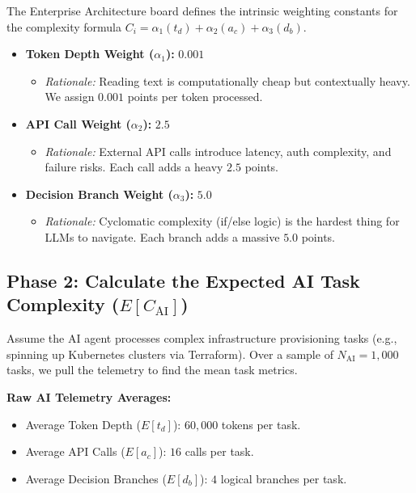 \documentclass[11pt,a4paper]{article}
\begin{document}
The Enterprise Architecture board defines the intrinsic weighting constants for the complexity formula $C_i = \alpha_1(t_d) + \alpha_2(a_c) + \alpha_3(d_b)$.

\begin{tcolorbox}[enhanced, colback=dpicloud!5!white, colframe=dpiblue, title={\textbf{Phase 1: Architecture Constants}}, fonttitle=\bfseries]
\begin{itemize}
    \item \textbf{Token Depth Weight ($\alpha_1$):} $0.001$ 
    \begin{itemize}
        \item \textit{Rationale:} Reading text is computationally cheap but contextually heavy. We assign $0.001$ points per token processed.
    \end{itemize}
    \item \textbf{API Call Weight ($\alpha_2$):} $2.5$ 
    \begin{itemize}
        \item \textit{Rationale:} External API calls introduce latency, auth complexity, and failure risks. Each call adds a heavy $2.5$ points.
    \end{itemize}
    \item \textbf{Decision Branch Weight ($\alpha_3$):} $5.0$ 
    \begin{itemize}
        \item \textit{Rationale:} Cyclomatic complexity (if/else logic) is the hardest thing for LLMs to navigate. Each branch adds a massive $5.0$ points.
    \end{itemize}
\end{itemize}
\end{tcolorbox}

\newpage

\subsection{Phase 2: Calculate the Expected AI Task Complexity ($E[C_{\text{AI}}]$)}

Assume the AI agent processes complex infrastructure provisioning tasks (e.g., spinning up Kubernetes clusters via Terraform). Over a sample of $N_{\text{AI}} = 1,000$ tasks, we pull the telemetry to find the mean task metrics.

\vspace{0.3cm}
\textbf{Raw AI Telemetry Averages:}
\begin{itemize}
    \item Average Token Depth ($E[t_d]$): $60,000$ tokens per task.
    \item Average API Calls ($E[a_c]$): $16$ calls per task.
    \item Average Decision Branches ($E[d_b]$): $4$ logical branches per task.
\end{itemize}
\end{document}
